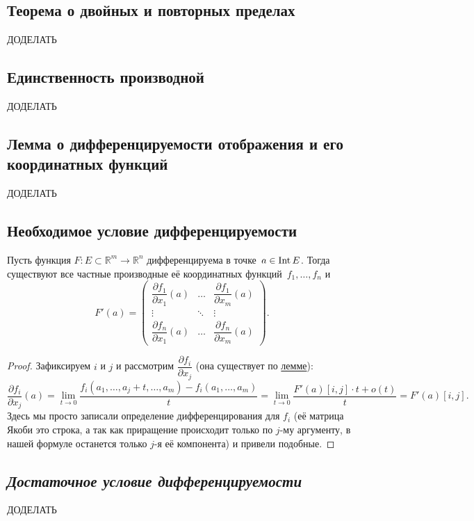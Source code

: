 \subsection{Теорема о двойных и повторных пределах}

ДОДЕЛАТЬ

\subsection{Единственность производной}

ДОДЕЛАТЬ

\subsection{Лемма о дифференцируемости отображения и его координатных функций}
\hypertarget{t75}{}
ДОДЕЛАТЬ

\subsection{Необходимое условие дифференцируемости}

\begin{theorem}
	Пусть функция \(F \colon E \subset \mathbb{R}^m \to \mathbb{R}^n\) дифференцируема в точке~\(a \in \operatorname{Int} E\). Тогда существуют все частные производные её координатных функций~\(f_1, \ldots, f_n\) и \[
		F'(a) = \begin{pmatrix}
			\dfrac{\partial f_1}{\partial x_1}(a) & \dots & \dfrac{\partial f_1}{\partial x_m}(a)\\
			\vdots & \ddots & \vdots \\
			\dfrac{\partial f_n}{\partial x_1}(a) & \dots & \dfrac{\partial f_n}{\partial x_m}(a)
		\end{pmatrix}.
	\]
\end{theorem}
\begin{proof}
	Зафиксируем \(i\) и \(j\) и рассмотрим \(\dfrac{\partial f_i}{\partial x_j}\) (она существует по \hyperlink{t75}{лемме}): \[
		\frac{\partial f_i}{\partial x_j}(a) = \lim_{t \to 0} \frac{f_i (a_1, \ldots, a_j + t, \ldots, a_m) - f_i (a_1, \ldots, a_m)}{t} = \lim_{t \to 0} \frac{F'(a)[i,j] \cdot t + o(t)}{t} = F'(a)[i,j].
	\]
	Здесь мы просто записали определение дифференцирования для \(f_i\) (её матрица Якоби это строка, а так как приращение происходит только по \(j\)-му аргументу, в нашей формуле останется только \(j\)-я её компонента) и привели подобные.
\end{proof}

\subsection{\itshape Достаточное условие дифференцируемости}

ДОДЕЛАТЬ
